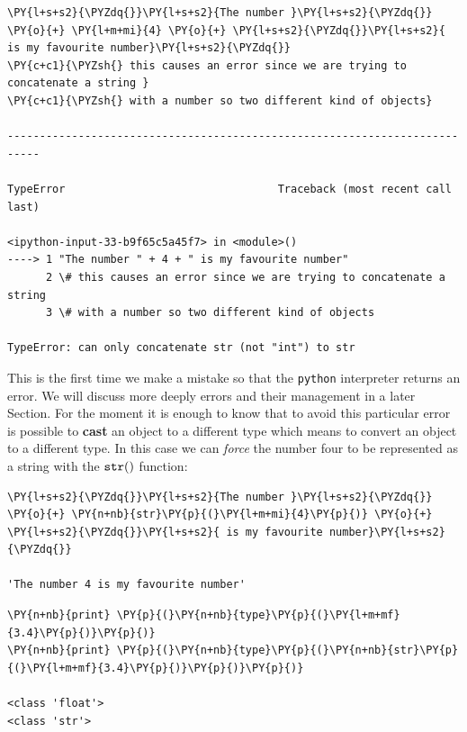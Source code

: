 \begin{codebox}            
\begin{Verbatim}[commandchars=\\\{\}]
\PY{l+s+s2}{\PYZdq{}}\PY{l+s+s2}{The number }\PY{l+s+s2}{\PYZdq{}} \PY{o}{+} \PY{l+m+mi}{4} \PY{o}{+} \PY{l+s+s2}{\PYZdq{}}\PY{l+s+s2}{ is my favourite number}\PY{l+s+s2}{\PYZdq{}}
\PY{c+c1}{\PYZsh{} this causes an error since we are trying to concatenate a string }
\PY{c+c1}{\PYZsh{} with a number so two different kind of objects}

---------------------------------------------------------------------------

TypeError                                 Traceback (most recent call last)

<ipython-input-33-b9f65c5a45f7> in <module>()
----> 1 "The number " + 4 + " is my favourite number"
      2 \# this causes an error since we are trying to concatenate a string
      3 \# with a number so two different kind of objects

TypeError: can only concatenate str (not "int") to str
\end{Verbatim}
\end{codebox}

This is the first time we make a mistake so that the \texttt{python} interpreter returns an error. We will 
discuss more deeply errors and their management in a later Section. 
For the moment it is enough to know that to avoid this particular error is possible to \textbf{cast} an object to a 
different type which means to convert an object to a different type. In this case we can \emph{force} the number four to be represented as a string with the \(\tt{str()}\) function:

\begin{codebox}            
\begin{Verbatim}[commandchars=\\\{\}]
\PY{l+s+s2}{\PYZdq{}}\PY{l+s+s2}{The number }\PY{l+s+s2}{\PYZdq{}} \PY{o}{+} \PY{n+nb}{str}\PY{p}{(}\PY{l+m+mi}{4}\PY{p}{)} \PY{o}{+} \PY{l+s+s2}{\PYZdq{}}\PY{l+s+s2}{ is my favourite number}\PY{l+s+s2}{\PYZdq{}}

'The number 4 is my favourite number'
\end{Verbatim}
\end{codebox}

\begin{codebox}            
\begin{Verbatim}[commandchars=\\\{\}]
\PY{n+nb}{print} \PY{p}{(}\PY{n+nb}{type}\PY{p}{(}\PY{l+m+mf}{3.4}\PY{p}{)}\PY{p}{)}
\PY{n+nb}{print} \PY{p}{(}\PY{n+nb}{type}\PY{p}{(}\PY{n+nb}{str}\PY{p}{(}\PY{l+m+mf}{3.4}\PY{p}{)}\PY{p}{)}\PY{p}{)}

<class 'float'>
<class 'str'>
\end{Verbatim}
\end{codebox}

